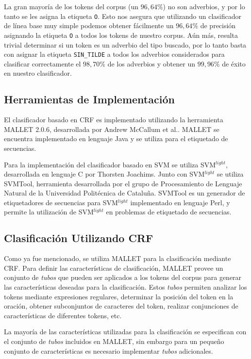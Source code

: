 \documentclass[runningheads,a4paper]{llncs}
\begin{document}
La gran mayoría de los tokens del corpus (un $96,64\%$)  no son adverbios, y por lo tanto se les asigna la etiqueta \texttt{\small O}. Esto nos asegura que utilizando un clasificador de línea base muy simple podemos obtener fácilmente un $96,64\%$ de precisión asignando la etiqueta \texttt{\small O} a todos los tokens de nuestro corpus. A\'un m\'as, resulta trivial determinar si un token es un adverbio del tipo buscado, por lo tanto basta con asignar la etiqueta \texttt{\small SIN\_TILDE} a todos los adverbios considerados para clasificar correctamente el $98,70\%$ de los adverbios y obtener un $99,96\%$ de \'exito en nuestro clasificador.

\subsection{Herramientas de Implementación}
El clasificador basado en CRF es implementado  utilizando la herramienta MALLET 2.0.6, desarrollada por Andrew McCallum et al.\cite{MCCALLUM02}. MALLET se encuentra implementado en lenguaje Java y se utiliza para el etiquetado de secuencias.

Para la implementaci\'on del clasificador basado en SVM se utiliza SVM$^{light}$, desarrollada en lenguaje C por Thorsten Joachims\cite{JOACHIMS08}. Junto con SVM$^{light}$ se utiliza SVMTool, herramienta desarrollada por el grupo de Procesamiento de Lenguaje Natural de la Universidad Politécnica de Cataluña\cite{GIMENEZ04}\cite{GIMENEZ06}. SVMTool es un generador de etiquetadores de secuencias para SVM$^{light}$ implementado en lenguaje Perl, y permite  la utilizaci\'on de SVM$^{light}$ en problemas de etiquetado de secuencias. 

\subsection{Clasificación Utilizando CRF}
Como ya fue mencionado, se utiliza MALLET para la clasificación mediante CRF. Para definir las características de clasificación, MALLET provee un conjunto de \emph{tubos} que pueden ser aplicados a los tokens del corpus para generar las características deseadas para la clasificaci\'on. Estos \emph{tubos} permiten analizar los tokens mediante expresiones regulares, determinar la posición del token en la oración, obtener subconjuntos de caracteres del token, realizar conjunciones de características de diferentes tokens, etc.

La mayoría de las características utilizadas para la clasificación se especifican con el conjunto de \emph{tubos} incluidos en MALLET, sin embargo para un pequeño conjunto de características es necesario implementar \emph{tubos} adicionales.
\end{document}
